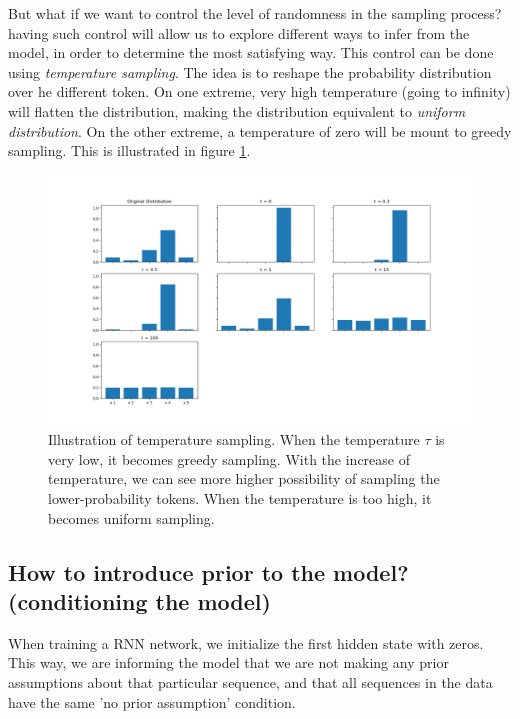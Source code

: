 \par But what if we want to control the level of randomness in the sampling process? having such control will allow us to explore different ways to infer from the model, in order to determine the most satisfying way. This control can be done using \textit{temperature sampling}. The idea is to reshape the probability distribution over he different token. On one extreme, very high temperature (going to infinity) will flatten the distribution, making the distribution equivalent to \textit{uniform distribution}. On the other extreme, a temperature of zero will be mount to greedy sampling. This is illustrated in figure \ref{fig:temperature_sampling}.

\begin{figure}
    \centering
    \includegraphics[scale=0.5]{images/gbem/temperature_sampling.png}
    \caption{Illustration of temperature sampling. When the temperature $\tau$ is very low, it becomes greedy sampling. With the increase of temperature, we can see more higher possibility of sampling the lower-probability tokens. When the temperature is too high, it becomes uniform sampling.}
    \label{fig:temperature_sampling}
\end{figure}


\subsection{How to introduce prior to the model? (conditioning the model)}
\par When training a RNN network, we initialize the first hidden state with zeros. This way, we are informing the model that we are not making any prior assumptions about that particular sequence, and that all sequences in the data have the same 'no prior assumption' condition.

